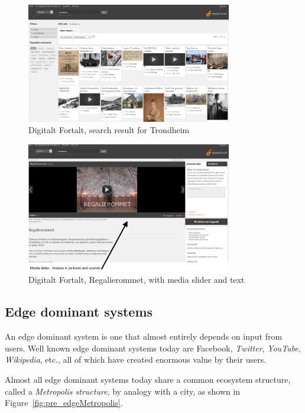 \documentclass[11pt]{book}
\begin{document}
\begin{figure}[H]
      \centering
      \includegraphics[width=0.8\textwidth]{Figures/Prestudy/digitaltfortaltSokTrondheim.png}
      \caption{ Digitalt Fortalt, search result for Trondheim}
      \label{fig:pre_fortaltTrondheim}
\end{figure}

\begin{figure}[H]
      \centering
      \includegraphics[width=0.8\textwidth]{Figures/Prestudy/digitaltfortaltRegalierommet.png}
      \caption{Digitalt Fortalt, Regalierommet, with media slider and text}
      \label{fig:pre_fortaltRegalierommet}
\end{figure}

\subsection{Edge dominant systems}\label{subsec:edge}
An edge dominant system is one that almost entirely depends on input from users. Well known edge dominant systems today are Facebook, \emph{Twitter}, \emph{YouTube}, \emph{Wikipedia}, etc., all of which have created enormous value by their users. 

Almost all edge dominant systems today share a common ecosystem structure, called a \emph{Metropolis structure}, by analogy with a city, as shown in Figure~\ref{fig:pre_edgeMetropolis}.
\end{document}
